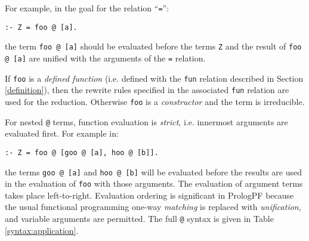 For example, in the goal for the relation ``\texttt{=}'':

\texttt{:- Z = foo @ [a].}

the term \texttt{foo @ [a]} should be evaluated
before the terms \texttt{Z} and the result of
\texttt{foo @ [a]} are unified with
the arguments of the \texttt{=} relation.

If \texttt{foo} is a \textit{defined function} 
(i.e. defined with the \texttt{fun} relation described in 
Section \ref{definition}), then the rewrite rules specified
in the associated \texttt{fun} relation are used for the reduction.
Otherwise \texttt{foo} is a \textit{constructor} and the term is
irreducible.

For nested \texttt{@} terms, function evaluation is \textit{strict},
i.e. innermost arguments are evaluated first.
For example in:

\texttt{:- Z = foo @ [goo @ [a], hoo @ [b]].}

the terms \texttt{goo @ [a]} and \texttt{hoo @ [b]} will be evaluated
before the results are used in the evaluation of \texttt{foo} with
those arguments.  The evaluation of argument terms takes place
left-to-right.  Evaluation ordering is significant in PrologPF because
the usual functional programming one-way \textit{matching} is
replaced with \textit{unification}, and variable arguments are permitted.
The full \texttt{@} syntax is given in Table \ref{syntax:application}.

